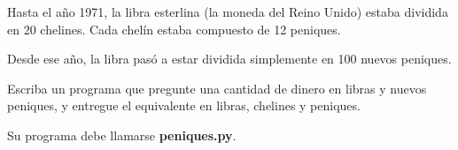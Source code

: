 \documentclass[12pt,spanish,letterpaper]{article}
\begin{document}
  Hasta el año 1971, la libra esterlina (la moneda del Reino Unido)
  estaba dividida en 20 chelines. Cada chelín estaba compuesto de 12 peniques.

  Desde ese año, la libra pasó a estar dividida simplemente en 100 nuevos peniques.

  Escriba un programa que pregunte una cantidad de dinero
  en libras y nuevos peniques,
  y entregue el equivalente en libras, chelines y peniques.

  \begin{minipage}[t]{.7\textwidth}
    
  \end{minipage}

  Su programa debe llamarse \textbf{peniques.py}.
\end{document}

